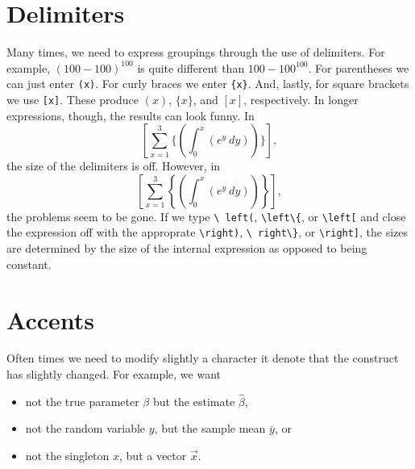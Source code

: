 \section{Delimiters}
Many times, we need to express groupings through the use of
delimiters. For example, $(100 - 100)^{100}$ is quite different than
$100 - 100^{100}$. For parentheses we can just enter \texttt{(x)}. For
curly braces we enter \texttt{\{x\}}. And, lastly, for square brackets
we use \texttt{[x]}. These produce $(x)$, $\{x\}$, and $[x]$,
respectively. In longer expressions, though, the results can look
funny.
In
\[
[\sum_{x=1}^{3} \{ (\int_{0}^{x} (e^{y}~dy))\}],
\]
the size of the delimiters is off. However, in
\[
\left[\sum_{x=1}^{3} \left\{ \left(\int_{0}^{x} (e^{y}~dy)\right)\right\}\right],
\]
the problems seem to be gone. If we type \texttt{\textbackslash
  left(}, \texttt{\textbackslash left\textbackslash\{}, or
\texttt{\textbackslash left[} and close the expression off with the
approprate \texttt{\textbackslash right)}, \texttt{\textbackslash
  right\textbackslash\}}, or \texttt{\textbackslash right]}, the sizes
are determined by the size of the internal expression as opposed to
being constant.
\section{Accents}

Often times we need to modify slightly a character it denote that the
construct has slightly changed. For example, we want
\begin{itemize}
\item not the true parameter $\beta$ but the estimate $\hat{\beta}$,
\item not the random variable $y$, but the sample mean $\bar{y}$, or
\item not the singleton $x$, but a vector $\vec{x}$.
\end{itemize}

